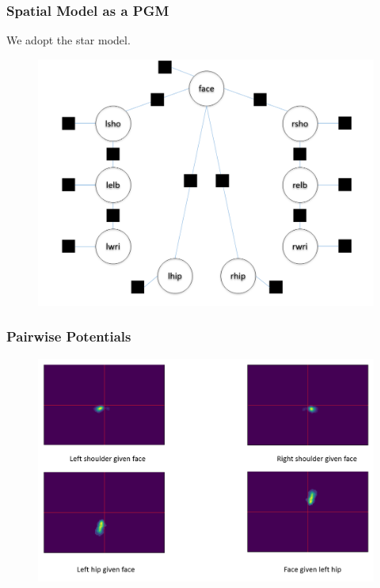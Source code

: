 \documentclass{beamer}
\begin{document}
	\begin{frame}[t]
        \frametitle{Spatial Model as a PGM}
        \begin{center}
			We adopt the star model.\\
            \begin{figure}[htbp] %
            \includegraphics[scale=0.3]{star_model.png}
            \end{figure}
        \end{center}
    \end{frame}

    \begin{frame}[t]
        \frametitle{Pairwise Potentials}
        \begin{center}
            \begin{figure}[htbp] %
            \includegraphics[scale=0.34]{pairwise_po.png}
            \end{figure}
        \end{center}
    \end{frame}
\end{document}
